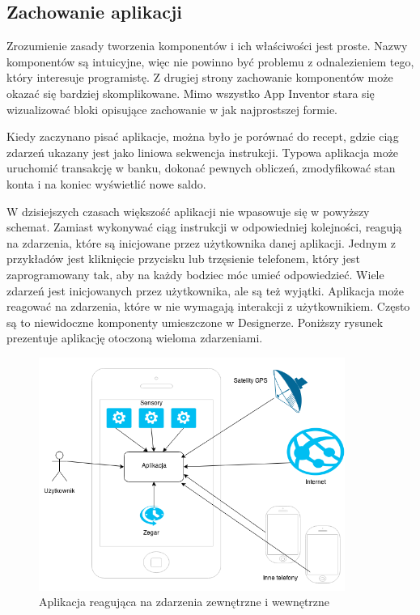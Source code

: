 \subsection{Zachowanie aplikacji}
\label{c322}
Zrozumienie zasady tworzenia komponentów i ich właściwości jest proste. Nazwy komponentów są intuicyjne, więc nie powinno być problemu z odnalezieniem tego, który interesuje programistę. Z drugiej strony zachowanie komponentów może okazać się bardziej skomplikowane. Mimo wszystko App Inventor stara się wizualizować bloki opisujące zachowanie w jak najprostszej formie.

Kiedy zaczynano pisać aplikacje, można było je porównać do recept, gdzie ciąg zdarzeń ukazany jest jako liniowa sekwencja instrukcji. Typowa aplikacja może uruchomić transakcję w banku, dokonać pewnych obliczeń, zmodyfikować stan konta i na koniec wyświetlić nowe saldo.\cite{appinventor:architektura}

W dzisiejszych czasach większość aplikacji nie wpasowuje się w powyższy schemat. Zamiast wykonywać ciąg instrukcji w odpowiedniej kolejności, reagują na zdarzenia, które są inicjowane przez użytkownika danej aplikacji. Jednym z przykładów jest kliknięcie przycisku lub trzęsienie telefonem, który jest zaprogramowany tak, aby na każdy bodziec móc umieć odpowiedzieć. Wiele zdarzeń jest inicjowanych przez użytkownika, ale są też wyjątki. Aplikacja może reagować na zdarzenia, które w nie wymagają interakcji z użytkownikiem. Często są to niewidoczne komponenty umieszczone w Designerze. Poniższy rysunek prezentuje aplikację otoczoną wieloma zdarzeniami.

\begin{figure}[th] 
\centering\includegraphics[width=10cm]{figures/events}
\caption{Aplikacja reagująca na zdarzenia zewnętrzne i wewnętrzne\cite{appinventor:architektura}}
\end{figure}

